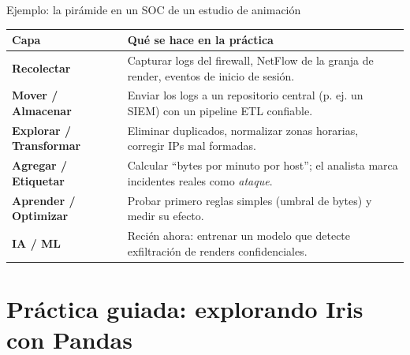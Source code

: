 \documentclass[10pt,aspectratio=169]{beamer}
\begin{document}
\begin{frame}{Ejemplo: la pirámide en un SOC de un estudio de animación}
  \small
  \renewcommand{\arraystretch}{1.3}
  \begin{tabular}{>{\bfseries}p{3.2cm} p{10.2cm}}
    \toprule
    Capa & Qué se hace en la práctica \\
    \midrule
    Recolectar & Capturar logs del firewall, NetFlow de la granja de render, eventos de inicio de sesión. \\
    Mover / Almacenar & Enviar los logs a un repositorio central (p. ej. un SIEM) con un pipeline ETL confiable. \\
    Explorar / Transformar & Eliminar duplicados, normalizar zonas horarias, corregir IPs mal formadas. \\
    Agregar / Etiquetar & Calcular ``bytes por minuto por host''; el analista marca incidentes reales como \emph{ataque}. \\
    Aprender / Optimizar & Probar primero reglas simples (umbral de bytes) y medir su efecto. \\
    \textcolor{usfxdorado}{IA / ML} & Recién ahora: entrenar un modelo que detecte exfiltración de renders confidenciales. \\
    \bottomrule
  \end{tabular}
\end{frame}

\section{Práctica guiada: explorando Iris con Pandas}
\end{document}
